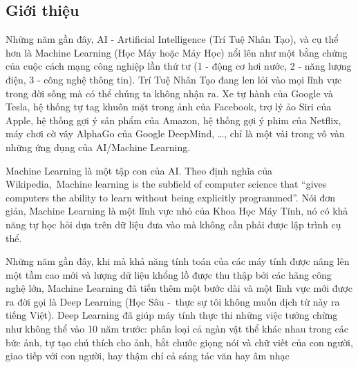 \subsection{Giới thiệu}
Những năm gần đây, AI - Artificial Intelligence (Trí Tuệ Nhân Tạo), và cụ thể hơn là Machine Learning (Học Máy hoặc Máy Học) nổi lên như một bằng chứng của cuộc cách mạng công nghiệp lần thứ tư (1 - động cơ hơi nước, 2 - năng lượng điện, 3 - công nghệ thông tin). 
Trí Tuệ Nhân Tạo đang len lỏi vào mọi lĩnh vực trong đời sống mà có thể chúng ta không nhận ra. 
Xe tự hành của Google và Tesla, hệ thống tự tag khuôn mặt trong ảnh của Facebook, trợ lý ảo Siri của Apple, hệ thống gợi ý sản phẩm của Amazon, hệ thống gợi ý phim của Netflix, máy chơi cờ vây AlphaGo của Google DeepMind, …, chỉ là một vài trong vô vàn những ứng dụng của AI/Machine Learning.
\par
Machine Learning là một tập con của AI. 
Theo định nghĩa của Wikipedia, Machine learning is the subfield of computer science that “gives computers the ability to learn without being explicitly programmed”. 
Nói đơn giản, Machine Learning là một lĩnh vực nhỏ của Khoa Học Máy Tính, nó có khả năng tự học hỏi dựa trên dữ liệu đưa vào mà không cần phải được lập trình cụ thể.
\par
Những năm gần đây, khi mà khả năng tính toán của các máy tính được nâng lên một tầm cao mới và lượng dữ liệu khổng lồ được thu thập bởi các hãng công nghệ lớn, Machine Learning đã tiến thêm một bước dài và một lĩnh vực mới được ra đời gọi là Deep Learning (Học Sâu - thực sự tôi không muốn dịch từ này ra tiếng Việt). 
Deep Learning đã giúp máy tính thực thi những việc tưởng chừng như không thể vào 10 năm trước: phân loại cả ngàn vật thể khác nhau trong các bức ảnh, tự tạo chú thích cho ảnh, bắt chước giọng nói và chữ viết của con người, giao tiếp với con người, hay thậm chí cả sáng tác văn hay âm nhạc
